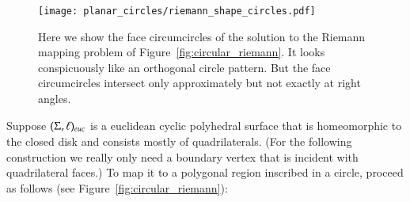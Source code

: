 \documentclass[Thesis]{subfiles}
\begin{document}
\begin{figure}
  \centering
  \texttt{[image: planar\_circles/riemann\_shape\_circles.pdf]}\\
  \caption{Here we show the face circumcircles of the solution to the
    Riemann mapping problem of Figure~\ref{fig:circular_riemann}. It
    looks conspicuously like an orthogonal circle pattern. But the
    face circumcircles intersect only approximately but not exactly at
    right angles.}
  \label{fig:riemann_circles}
\end{figure}


Suppose $(\Sigma,\ell)_{\euc}$ is a euclidean cyclic polyhedral
surface that is homeomorphic to the closed disk and consists mostly of
quadrilaterals. (For the following construction we really only need a
boundary vertex that is incident with quadrilateral faces.) To map it
to a polygonal region inscribed in a circle, proceed as follows (see
Figure~\ref{fig:circular_riemann}):

\end{document}
